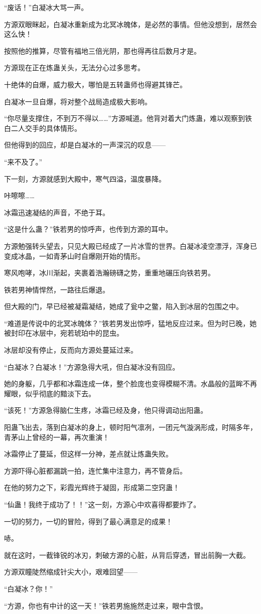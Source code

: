 \begin{this_body}
“废话！”白凝冰大骂一声。

方源双眼眯起，白凝冰重新成为北冥冰魄体，是必然的事情。但他没想到，居然会这么快！

按照他的推算，尽管有福地三倍光阴，那也得再往后数月才是。

方源现在正在炼蛊关头，无法分心过多思考。

十绝体的自爆，威力极大，哪怕是五转蛊师也得避其锋芒。

白凝冰一旦自爆，将对整个战局造成极大影响。

“你尽量支撑住，不到万不得以……”方源喊道。他背对着大门炼蛊，难以观察到铁白二人交手的具体情形。

但他得到的回应，却是白凝冰的一声深沉的叹息——

“来不及了。”

下一刻，方源就感到大殿中，寒气四溢，温度暴降。

咔嚓嚓……

冰霜迅速凝结的声音，不绝于耳。

“这是什么蛊？”铁若男的惊呼声，也传到方源的耳中。

方源勉强转头望去，只见大殿已经成了一片冰雪的世界。白凝冰凌空漂浮，浑身已变成冰晶，一如青茅山时自爆刚开始的情形。

寒风咆哮，冰川渐起，夹裹着浩瀚磅礴之势，重重地碾压向铁若男。

铁若男神情悍然，一路往后爆退。

但大殿的门，早已经被凝霜凝结，她成了瓮中之鳖，陷入到冰层的包围之中。

“难道是传说中的北冥冰魄体？”铁若男发出惊呼，猛地反应过来。但为时已晚，她被封印在冰层中，宛若琥珀中的昆虫。

冰层却没有停止，反而向方源处蔓延过来。

“白凝冰？白凝冰！”方源急得大吼，但白凝冰没有回应。

她的身躯，几乎都和冰霜连成一体，整个脸庞也变得模糊不清。水晶般的蓝眸不再耀眼，似乎彻底的黯淡下去。

“该死！”方源急得脑仁生疼，冰霜已经及身，他只得调动出阳蛊。

阳蛊飞出去，落到白凝冰的身上，顿时阳气凛冽，一团元气漩涡形成，时隔多年，青茅山上曾经的一幕，再次重演！

冰霜停止了蔓延，但这样一分神，差点就让炼蛊失败。

方源吓得心脏都漏跳一拍，连忙集中注意力，再不管身后。

在他的努力之下，彩霞光辉终于凝固，形成第二空窍蛊！

“仙蛊！我终于成功了！！”这一刻，方源心中欢喜得都要炸了。

一切的努力，一切的冒险，得到了最心满意足的成果！

哧。

就在这时，一截锋锐的冰刃，刺破方源的心脏，从背后穿透，冒出前胸一大截。

方源双瞳陡然缩成针尖大小，艰难回望——

“白凝冰？你！”

“方源，你也有中计的这一天！”铁若男施施然走过来，眼中含恨。

\end{this_body}

